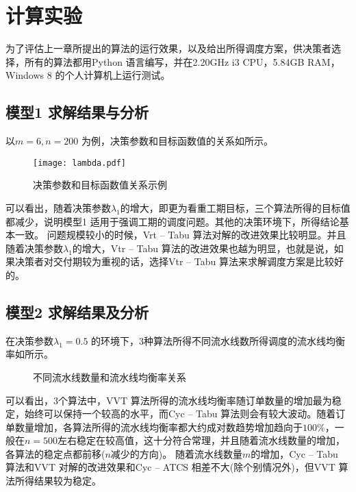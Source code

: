 \chapter{计算实验}
为了评估上一章所提出的算法的运行效果，以及给出所得调度方案，供决策者选择，所有的算法都用Python 语言编写，并在2.20GHz i3 CPU，5.84GB RAM，Windows 8 的个人计算机上运行测试。

\section{模型1 求解结果与分析}
以$m = 6, n = 200$ 为例，决策参数和目标函数值的关系如所示。
\begin{figure}
\centering
\texttt{[image: lambda.pdf]}
\caption{决策参数和目标函数值关系示例}\label{fig:decisionvsG}
\end{figure}
可以看出，随着决策参数$\lambda_1$的增大，即更为看重工期目标，三个算法所得的目标值都减少，说明模型1 适用于强调工期的调度问题。其他的决策环境下，所得结论基本一致。
问题规模较小的时候，Vrt -- Tabu 算法对解的改进效果比较明显。并且随着决策参数$\lambda_1$的增大，Vtr -- Tabu 算法的改进效果也越为明显，也就是说，如果决策者对交付期较为重视的话，选择Vtr -- Tabu 算法来求解调度方案是比较好的。
\section{模型2 求解结果及分析}
在决策参数$\lambda_1 = 0.5$ 的环境下，$3$种算法所得不同流水线数所得调度的流水线均衡率如所示。
\begin{figure}[h]
\centering
{}
\caption{不同流水线数量和流水线均衡率关系}\label{fig:linenumbervsrate}
\end{figure}

可以看出，$3$个算法中，VVT 算法所得的流水线均衡率随订单数量的增加最为稳定，始终可以保持一个较高的水平，而Cyc -- Tabu 算法则会有较大波动。随着订单数量增加，各算法所得的流水线均衡率都大约成对数趋势增加趋向于$100\%$，一般在$n = 500$左右稳定在较高值，这十分符合常理，并且随着流水线数量的增加，各算法的稳定点都前移($n$减少的方向)。
随着流水线数量$m$的增加，Cyc -- Tabu 算法和VVT 对解的改进效果和Cyc -- ATCS 相差不大(除个别情况外)，但VVT 算法所得结果较为稳定。

